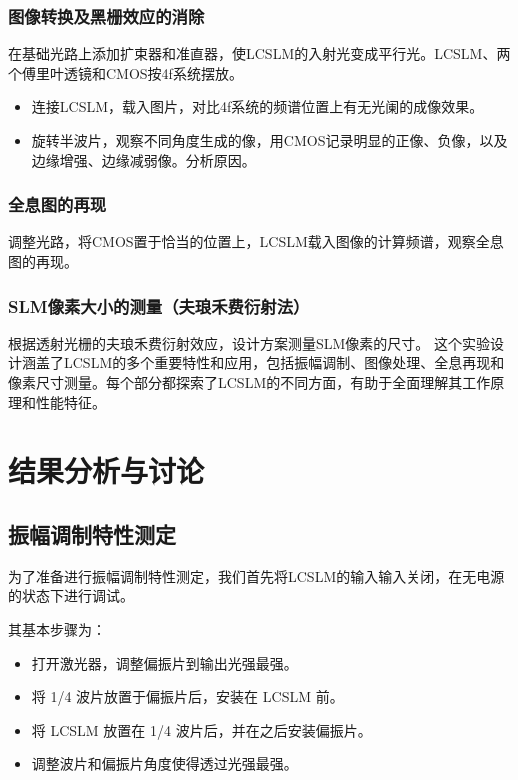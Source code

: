 \documentclass{whureport}
\begin{document}
\begin{multicols}{2}
\subsubsection{图像转换及黑栅效应的消除}
在基础光路上添加扩束器和准直器，使LCSLM的入射光变成平行光。LCSLM、两个傅里叶透镜和CMOS按4f系统摆放。
\begin{itemize}
\item 连接LCSLM，载入图片，对比4f系统的频谱位置上有无光阑的成像效果。
\item 旋转半波片，观察不同角度生成的像，用CMOS记录明显的正像、负像，以及边缘增强、边缘减弱像。分析原因。
\end{itemize}
\subsubsection{全息图的再现}
调整光路，将CMOS置于恰当的位置上，LCSLM载入图像的计算频谱，观察全息图的再现。
\subsubsection{SLM像素大小的测量（夫琅禾费衍射法）}
根据透射光栅的夫琅禾费衍射效应，设计方案测量SLM像素的尺寸。
这个实验设计涵盖了LCSLM的多个重要特性和应用，包括振幅调制、图像处理、全息再现和像素尺寸测量。每个部分都探索了LCSLM的不同方面，有助于全面理解其工作原理和性能特征。
\section{结果分析与讨论}
\subsection{振幅调制特性测定}
为了准备进行振幅调制特性测定，我们首先将LCSLM的输入输入关闭，在无电源的状态下进行调试。

其基本步骤为：
\begin{itemize}
\item 打开激光器，调整偏振片到输出光强最强。
\item 将 1/4 波片放置于偏振片后，安装在 LCSLM 前。
\item 将 LCSLM 放置在 1/4 波片后，并在之后安装偏振片。
\item 调整波片和偏振片角度使得透过光强最强。
\end{itemize}


\end{multicols}
\end{document}
